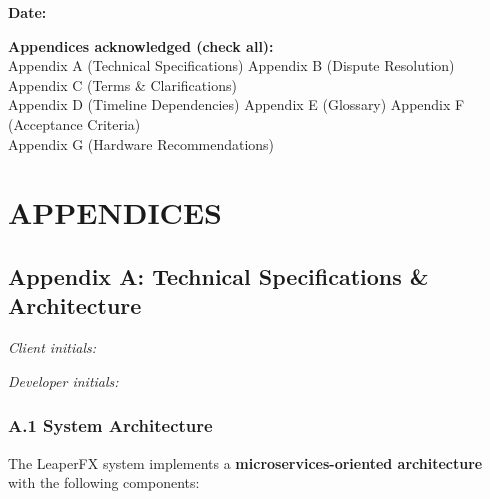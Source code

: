 \documentclass[11pt, a4paper]{article}
\begin{document}
\begin{Form}
\begin{minipage}[t]{0.48\textwidth}
    \textbf{Date:}\\[5pt]
    \TextField[name=developer_date,width=4.5cm]{}
\end{minipage}

\vspace{1cm}
\noindent\textbf{Appendices acknowledged (check all): }\\[5pt]
\CheckBox[name=ackA]{} Appendix A (Technical Specifications) \quad
\CheckBox[name=ackB]{} Appendix B (Dispute Resolution) \quad
\CheckBox[name=ackC]{} Appendix C (Terms \& Clarifications)\\
\CheckBox[name=ackD]{} Appendix D (Timeline Dependencies) \quad
\CheckBox[name=ackE]{} Appendix E (Glossary) \quad
\CheckBox[name=ackF]{} Appendix F (Acceptance Criteria)\\
\CheckBox[name=ackG]{} Appendix G (Hardware Recommendations)
\end{Form}

\newpage
\section*{APPENDICES}

\subsection*{Appendix A: Technical Specifications \& Architecture}
\label{appendix:tech}
\noindent
\begin{minipage}[t]{0.45\textwidth}
\textit{Client initials: }\TextField[name=init_client_A,width=1.6cm,bordercolor={0.7 0.7 0.7}]{}
\end{minipage}%
\hfill%
\begin{minipage}[t]{0.45\textwidth}
\raggedleft
\textit{Developer initials: }\TextField[name=init_dev_A,width=1.6cm,bordercolor={0.7 0.7 0.7}]{}
\end{minipage}
\vspace{0.3cm}

\subsubsection*{A.1 System Architecture}
The LeaperFX system implements a \textbf{microservices-oriented architecture} with the following components:
\end{document}
